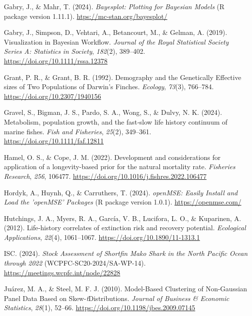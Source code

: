\documentclass[
  11pt,
]{SCreport}
\newlength{\cslhangindent}
\newenvironment{CSLReferences}[2] %
 {\begin{list}{}{%
  \setlength{\itemindent}{0pt}
  \setlength{\leftmargin}{0pt}
  \setlength{\parsep}{0pt}
  \ifodd #1
   \setlength{\leftmargin}{\cslhangindent}
   \setlength{\itemindent}{-1\cslhangindent}
  \fi
  \setlength{\itemsep}{#2\baselineskip}}}
 {\end{list}}
\begin{document}
\begin{CSLReferences}{1}{0}
Gabry, J., \& Mahr, T. (2024). \emph{Bayesplot: {Plotting} for
{Bayesian} {Models}} (R package version 1.11.1).
\url{htps://mc-stan.org/bayesplot/}

Gabry, J., Simpson, D., Vehtari, A., Betancourt, M., \& Gelman, A.
(2019). Visualization in {Bayesian} {Workflow}. \emph{Journal of the
Royal Statistical Society Series A: Statistics in Society},
\emph{182}(2), 389--402. \url{https://doi.org/10.1111/rssa.12378}

Grant, P. R., \& Grant, B. R. (1992). Demography and the {Genetically}
{Effective} sizes of {Two} {Populations} of {Darwin}'s {Finches}.
\emph{Ecology}, \emph{73}(3), 766--784.
\url{https://doi.org/10.2307/1940156}

Gravel, S., Bigman, J. S., Pardo, S. A., Wong, S., \& Dulvy, N. K.
(2024). Metabolism, population growth, and the fast‐slow life history
continuum of marine fishes. \emph{Fish and Fisheries}, \emph{25}(2),
349--361. \url{https://doi.org/10.1111/faf.12811}

Hamel, O. S., \& Cope, J. M. (2022). Development and considerations for
application of a longevity-based prior for the natural mortality rate.
\emph{Fisheries Research}, \emph{256}, 106477.
\url{https://doi.org/10.1016/j.fishres.2022.106477}

Hordyk, A., Huynh, Q., \& Carruthers, T. (2024). \emph{{openMSE}:
{Easily} {Install} and {Load} the '{openMSE}' {Packages}} (R package
version 1.0.1). \url{https://openmse.com/}

Hutchings, J. A., Myers, R. A., García, V. B., Lucifora, L. O., \&
Kuparinen, A. (2012). Life‐history correlates of extinction risk and
recovery potential. \emph{Ecological Applications}, \emph{22}(4),
1061--1067. \url{https://doi.org/10.1890/11-1313.1}

ISC. (2024). \emph{Stock {Assessment} of {Shortfin} {Mako} {Shark} in
the {North} {Pacific} {Ocean} through 2022} (WCPFC-SC20-2024/SA-WP-14).
\url{https://meetings.wcpfc.int/node/22828}

Juárez, M. A., \& Steel, M. F. J. (2010). Model-{Based} {Clustering} of
{Non}-{Gaussian} {Panel} {Data} {Based} on
{Skew}-\emph{t}{Distributions}. \emph{Journal of Business \& Economic
Statistics}, \emph{28}(1), 52--66.
\url{https://doi.org/10.1198/jbes.2009.07145}


\end{CSLReferences}
\end{document}
